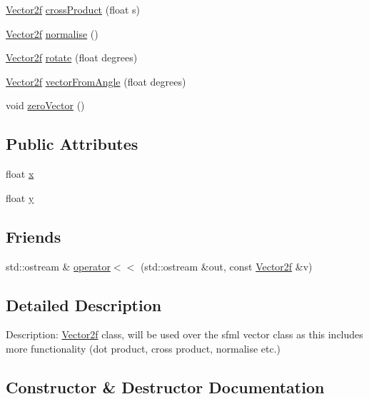 \begin{DoxyCompactItemize}
\item 
\mbox{\hyperlink{class_vector2f}{Vector2f}} \mbox{\hyperlink{class_vector2f_a5f463c9fd9bba6bfe9b2c83aeeb887cc}{cross\+Product}} (float s)
\item 
\mbox{\hyperlink{class_vector2f}{Vector2f}} \mbox{\hyperlink{class_vector2f_aa154fbe174de5ab0ba9a4cf9422cd366}{normalise}} ()
\item 
\mbox{\hyperlink{class_vector2f}{Vector2f}} \mbox{\hyperlink{class_vector2f_a39fb9f4a82e635628608541463a3cc62}{rotate}} (float degrees)
\item 
\mbox{\hyperlink{class_vector2f}{Vector2f}} \mbox{\hyperlink{class_vector2f_a2a036b477c45120487577a9079acdac4}{vector\+From\+Angle}} (float degrees)
\item 
void \mbox{\hyperlink{class_vector2f_ab3f811f694179f670ea6cd7136864aca}{zero\+Vector}} ()
\end{DoxyCompactItemize}
\subsection*{Public Attributes}
\begin{DoxyCompactItemize}
\item 
float \mbox{\hyperlink{class_vector2f_add58d2378e3a3abdb76cf0ac51c9acfc}{x}}
\item 
float \mbox{\hyperlink{class_vector2f_a14874a72597fd358b15f8ba34b999c4d}{y}}
\end{DoxyCompactItemize}
\subsection*{Friends}
\begin{DoxyCompactItemize}
\item 
std\+::ostream \& \mbox{\hyperlink{class_vector2f_a957a07113aed7ba18d2e3f63894a55a5}{operator$<$$<$}} (std\+::ostream \&out, const \mbox{\hyperlink{class_vector2f}{Vector2f}} \&v)
\end{DoxyCompactItemize}


\subsection{Detailed Description}
Description\+: \mbox{\hyperlink{class_vector2f}{Vector2f}} class, will be used over the sfml vector class as this includes more functionality (dot product, cross product, normalise etc.) 

\subsection{Constructor \& Destructor Documentation}
\mbox{\label{class_vector2f_a3db9a868c58bc809e5e09a88d65a77ec}} 
